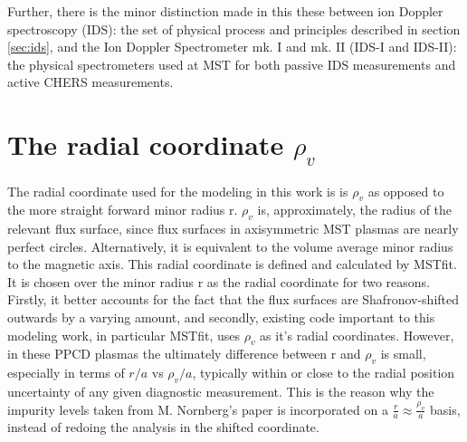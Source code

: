 \begin{refsection}
Further, there is the minor distinction made in this these between ion Doppler spectroscopy (IDS): the set of physical process and principles described in section \ref{sec:ids}, and the Ion Doppler Spectrometer mk. I and mk. II (IDS-I and IDS-II): the physical spectrometers used at MST for both passive IDS measurements and active CHERS measurements.

\section{The radial coordinate $\rho_v$}\label{app:rhov}

The radial coordinate used for the modeling in this work is is $\rho_v$ as opposed to the more straight forward minor radius r. $\rho_v$ is, approximately, the radius of the relevant flux surface, since flux surfaces in axisymmetric MST plasmas are nearly perfect circles. Alternatively, it is equivalent to the volume average minor radius to the magnetic axis. This radial coordinate is defined and calculated by MSTfit\cite{Anderson2001}. It is chosen over the minor radius r as the radial coordinate for two reasons. Firstly, it better accounts for the fact that the flux surfaces are Shafronov-shifted outwards by a varying amount, and secondly, existing code important to this modeling work, in particular MSTfit, uses $\rho_v$ as it's radial coordinates. However, in these PPCD plasmas the ultimately difference between r and $\rho_v$ is small, especially in terms of $r/a$ vs $\rho_v/a$, typically within or close to the radial position uncertainty of any given diagnostic measurement. This is the reason why the impurity levels taken from M. Nornberg's paper\cite{Nornberg2018} is incorporated on a $\frac{r}{a}\approx\frac{\rho_v}{a}$ basis, instead of redoing the analysis in the shifted coordinate. 


\printbibliography
\end{refsection}